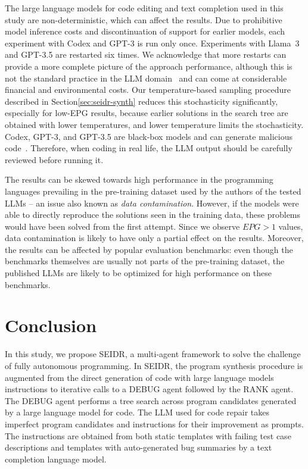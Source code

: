 The large language models for code editing and text completion used in this study are non-deterministic, 
which can affect the results. 
Due to prohibitive model inference costs and discontinuation of support for earlier models, each experiment with Codex and GPT-3 is run only once. 
Experiments with Llama~3 and GPT-3.5 are restarted six times. 
We acknowledge that more restarts can provide a more complete picture of the approach performance,
although this is not the standard practice in the LLM domain~\cite{ouyang2023:llm} 
and can come at considerable financial and environmental costs.
Our temperature-based sampling procedure described in Section\ref{sec:seidr-synth} reduces this stochasticity significantly, especially for low-EPG results, because earlier solutions in the search tree are obtained with lower temperatures, and lower temperature limits the stochasticity.
Codex, GPT-3, and GPT-3.5 are black-box models and can generate malicious code~\cite{pearceAsleepKeyboardAssessing2022}. 
Therefore, when coding in real life, the LLM output should be carefully reviewed before running it.

The results can be skewed towards high performance in the programming languages prevailing in the pre-training dataset used by the authors of the tested LLMs -- an issue also known as \emph{data contamination}.
However, if the models were able to directly reproduce the solutions seen in the training data, 
these problems would have been solved from the first attempt.
Since we observe $EPG>1$ values, data contamination is likely to have only a partial effect on the results.
Moreover, the results can be affected by popular evaluation benchmarks: even though the benchmarks themselves are usually not parts of the pre-training dataset, the published LLMs are likely to be optimized for high performance on these benchmarks.   

\section{Conclusion}
\label{sec:seidr-conclusion}


In this study, we propose SEIDR, a multi-agent framework to solve the challenge of fully autonomous programming. 
In SEIDR, the program synthesis procedure is augmented from the direct generation of code with large language models instructions to iterative calls to a DEBUG agent followed by the RANK agent. 
The DEBUG agent performs a tree search across program candidates generated by a large language model for code.
The LLM used for code repair takes imperfect program candidates and instructions for their improvement as prompts. 
The instructions are obtained from both static templates with failing test case descriptions and templates with auto-generated bug summaries by a text completion language model. 

